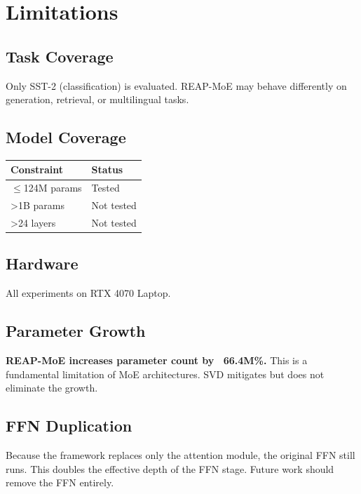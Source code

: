 \section{Limitations}

\subsection{Task Coverage}

Only SST-2 (classification) is evaluated. REAP-MoE may behave differently 
on generation, retrieval, or multilingual tasks.

\subsection{Model Coverage}

\begin{table}[H]
\centering
\small
\begin{tabular}{ll}
\toprule
\textbf{Constraint} & \textbf{Status} \\
\midrule
$\le$124M params & Tested \\
>1B params & Not tested \\
>24 layers & Not tested \\
\bottomrule
\end{tabular}
\end{table}

\subsection{Hardware}

All experiments on RTX 4070 Laptop.

\subsection{Parameter Growth}

\textbf{REAP-MoE increases parameter count by ~66.4M\%.} This is a 
fundamental limitation of MoE architectures. SVD mitigates but does not 
eliminate the growth.

\subsection{FFN Duplication}

Because the framework replaces only the attention module, the original FFN 
still runs. This doubles the effective depth of the FFN stage. Future work 
should remove the FFN entirely.

